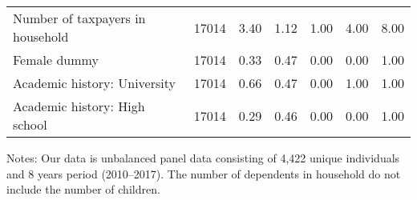 \begin{table}
\begin{threeparttable}
\begin{tabular}[t]{lcccccc}
\hspace{1em}Number of taxpayers in household & 17014 & \num{3.40} & \num{1.12} & \num{1.00} & \num{4.00} & \num{8.00}\\
\hspace{1em}Female dummy & 17014 & \num{0.33} & \num{0.47} & \num{0.00} & \num{0.00} & \num{1.00}\\
\hspace{1em}Academic history: University & 17014 & \num{0.66} & \num{0.47} & \num{0.00} & \num{1.00} & \num{1.00}\\
\hspace{1em}Academic history: High school & 17014 & \num{0.29} & \num{0.46} & \num{0.00} & \num{0.00} & \num{1.00}\\
\bottomrule
\end{tabular}
\begin{tablenotes}
\item Notes: Our data is unbalanced panel data consisting of 4,422 unique individuals and 8 years period (2010--2017). The number of dependents in household do not include the number of children.
\end{tablenotes}
\end{threeparttable}
\end{table}
